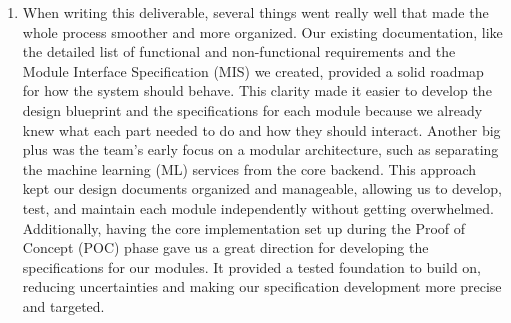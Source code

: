 \documentclass[12pt, titlepage]{article}
\begin{document}
\newpage
\begin{enumerate}
    \item When writing this deliverable, several things went really well that made the whole process smoother and more organized. Our existing documentation, like the detailed list of functional and non-functional requirements and the Module Interface Specification (MIS) we created, provided a solid roadmap for how the system should behave. This clarity made it easier to develop the design blueprint and the specifications for each module because we already knew what each part needed to do and how they should interact. Another big plus was the team’s early focus on a modular architecture, such as separating the machine learning (ML) services from the core backend. This approach kept our design documents organized and manageable, allowing us to develop, test, and maintain each module independently without getting overwhelmed. Additionally, having the core implementation set up during the Proof of Concept (POC) phase gave us a great direction for developing the specifications for our modules. It provided a tested foundation to build on, reducing uncertainties and making our specification development more precise and targeted.
\end{enumerate}
\end{document}
